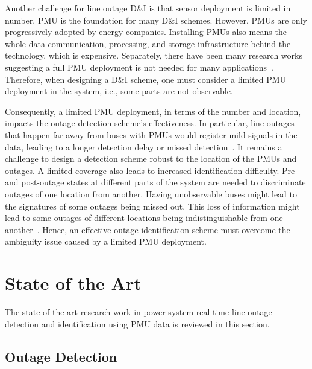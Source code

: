 Another challenge for line outage D\&I is that sensor deployment is limited in number. 
PMU is the foundation for many D\&I schemes. However, PMUs are only progressively adopted by energy companies. Installing PMUs also means the whole data communication, processing, and storage infrastructure behind the technology, which is expensive. Separately, there have been many research works suggesting a full PMU deployment is not needed for many applications~\cite{aminifar2014synchrophasor}. Therefore, when designing a D\&I scheme, one must consider a limited PMU deployment in the system, i.e., some parts are not observable.

Consequently, a limited PMU deployment, in terms of the number and location, impacts the outage detection scheme’s effectiveness. In particular, line outages that happen far away from buses with PMUs would register mild signals in the data, leading to a longer detection delay or missed detection~\cite{yang2020control}. It remains a challenge to design a detection scheme robust to the location of the PMUs and outages. 
A limited coverage also leads to increased identification difficulty. Pre- and post-outage states at different parts of the system are needed to discriminate outages of one location from another. Having unobservable buses might lead to the signatures of some outages being missed out. This loss of information might lead to some outages of different locations being indistinguishable from one another~\cite{Wu2015,Costilla-Enriquez2019,yang2021particle}. Hence, an effective outage identification scheme must overcome the ambiguity issue caused by a limited PMU deployment.



\section{State of the Art}

The state-of-the-art research work in power system real-time line outage detection and identification using PMU data is reviewed in this section. 

\subsection{Outage Detection} %
\label{sub:outage_detection}

